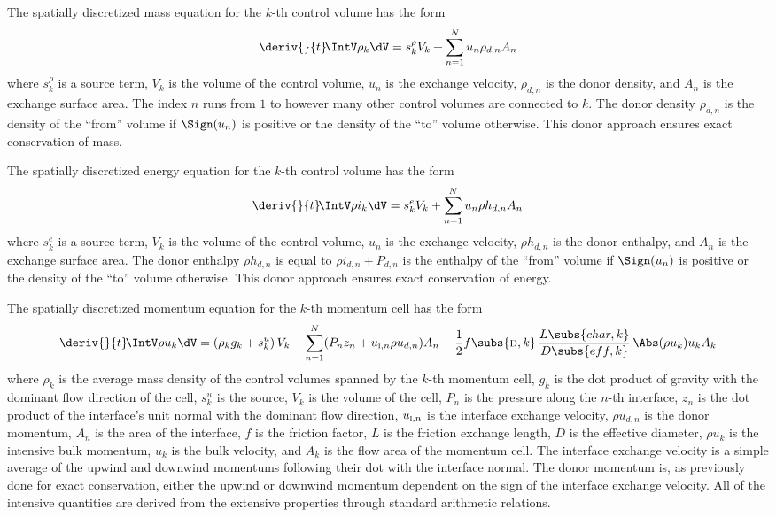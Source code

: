 The spatially discretized mass equation for the $k$-th control volume has the form
\begin{equation}
    \deriv{}{t}\!\IntV \rho_k \dV = s^\rho_k V_k + \sum_{n=1}^{N} u_n \rho_{d,n} A_n  \label{Eqn:SemiMass}
\end{equation}
where $s^\rho_k$ is a source term, $V_k$ is the volume of the control volume, $u_n$ is the exchange velocity, $\rho_{d,n}$ is the donor density, and $A_n$ is the exchange surface area.  The index $n$ runs from $1$ to however many other control volumes are connected to $k$.
The donor density $\rho_{d,n}$ is the density of the ``from'' volume if $\Sign(u_n)$ is positive or the density of the ``to'' volume otherwise.
This donor approach ensures exact conservation of mass.

The spatially discretized energy equation for the $k$-th control volume has the form
\begin{equation}
    \deriv{}{t}\! \IntV \rho i_k \dV = s^e_k V_k + \sum_{n=1}^{N} u_n \rho{h}_{d,n} A_n \label{Eqn:SemiEnergy}
\end{equation}
where $s^e_k$ is a source term, $V_k$ is the volume of the control volume, $u_n$ is the exchange velocity, $\rho{h}_{d,n}$ is the donor enthalpy, and $A_n$ is the exchange surface area.  The donor enthalpy $\rho{h}_{d,n}$ is equal to $\rho{i}_{d,n} + P_{d,n}$ is the enthalpy of the ``from'' volume if $\Sign(u_n)$ is positive or the density of the ``to'' volume otherwise.
This donor approach ensures exact conservation of energy.



The spatially discretized momentum equation for the $k$-th momentum cell has the form
\begin{equation}
    \deriv{}{t}\! \IntV \rho u_k \dV = 
    (\rho_k g_k + s^u_k)\,V_k 
    - \sum_{n=1}^{N}   (P_n z_n +  u_{\text{\textsc{i}},n} \rho{u}_{d,n}) A_n 
    - \frac{1}{2} f\subs{\textsc{d},k}\,\frac{L\subs{char,k}}{D\subs{eff,k}}\,\Abs(\rho{u}_k) u_k A_k  \label{Eqn:SemiMomentum}
\end{equation}
where $\rho_k$ is the average mass density of the control volumes spanned by the $k$-th momentum cell, $g_k$ is the dot product of gravity with the dominant flow direction of the cell, $s^u_k$ is the source, $V_k$ is the volume of the cell, $P_n$ is the pressure along the $n$-th interface, $z_n$ is the dot product of the interface's unit normal with the dominant flow direction, $u_{\text{\textsc{i}},n}$ is the interface exchange velocity,
$\rho{u}_{d,n}$ is the donor momentum, $A_n$ is the area of the interface, 
$f$ is the friction factor, $L$ is the friction exchange length, $D$ is the effective diameter, 
$\rho{u}_k$ is the intensive bulk momentum, $u_k$ is the bulk velocity, and $A_k$ is the flow area of the momentum cell.
The interface exchange velocity is a simple average of the upwind and downwind momentums following their dot with the interface normal.
The donor momentum is, as previously done for exact conservation, either the upwind or downwind momentum dependent on the sign of the interface exchange velocity.
All of the intensive quantities are derived from the extensive properties through standard arithmetic relations.


